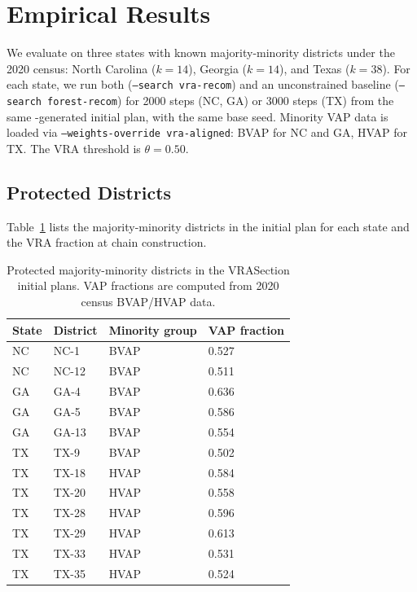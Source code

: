 \section{Empirical Results}
\label{sec:empirical}

We evaluate \vr{} on three states with known majority-minority districts under
the 2020 census: North Carolina ($k = 14$), Georgia ($k = 14$), and Texas
($k = 38$).
For each state, we run both \vr{} (\texttt{--search vra-recom}) and an
unconstrained \fr{} baseline (\texttt{--search forest-recom}) for 2000 steps
(NC, GA) or 3000 steps (TX) from the same \vraSection{}-generated initial plan,
with the same base seed.
Minority VAP data is loaded via \texttt{--weights-override vra-aligned}:
BVAP for NC and GA, HVAP for TX.
The VRA threshold is $\theta = 0.50$.

\subsection{Protected Districts}

Table~\ref{tab:protected} lists the majority-minority districts in the initial
plan for each state and the VRA fraction at chain construction.

\begin{table}[ht]
\centering
\caption{Protected majority-minority districts in the VRASection initial plans.
         VAP fractions are computed from 2020 census BVAP/HVAP data.}
\label{tab:protected}
\begin{tabular}{llll}
\toprule
\textbf{State} & \textbf{District} & \textbf{Minority group} & \textbf{VAP fraction} \\
\midrule
NC & NC-1  & BVAP & 0.527 \\
NC & NC-12 & BVAP & 0.511 \\
\midrule
GA & GA-4  & BVAP & 0.636 \\
GA & GA-5  & BVAP & 0.586 \\
GA & GA-13 & BVAP & 0.554 \\
\midrule
TX & TX-9  & BVAP & 0.502 \\
TX & TX-18 & HVAP & 0.584 \\
TX & TX-20 & HVAP & 0.558 \\
TX & TX-28 & HVAP & 0.596 \\
TX & TX-29 & HVAP & 0.613 \\
TX & TX-33 & HVAP & 0.531 \\
TX & TX-35 & HVAP & 0.524 \\
\bottomrule
\end{tabular}
\end{table}

